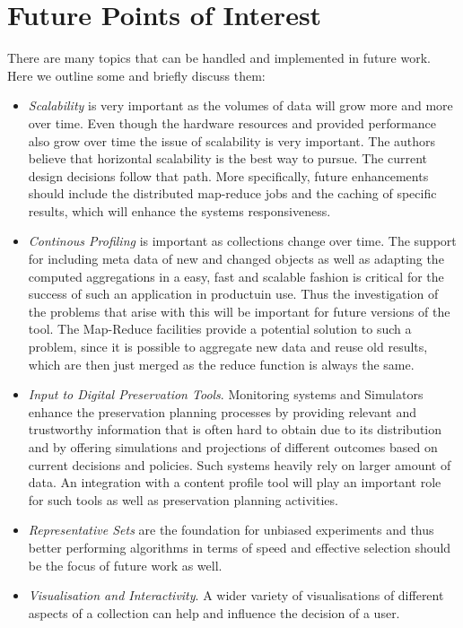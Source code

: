 \section{Future Points of Interest}
There are many topics that can be handled and implemented in future work. Here we outline some and briefly discuss them:
\begin {itemize}
\item \textit{Scalability} is very important as the volumes of data will grow more and more over time. Even though the hardware resources and provided performance also grow over time the issue of scalability is very important. The authors believe that horizontal scalability is the best way to pursue. The current design decisions follow that path. More specifically, future enhancements should include the distributed map-reduce jobs and the caching of specific results, which will enhance the systems responsiveness.
\item \textit{Continous Profiling} is important as collections change over time. The support for including meta data of new and changed objects as well as adapting the computed aggregations in a easy, fast and scalable fashion is critical for the success of such an application in productuin use. Thus the investigation of the problems that arise with this will be important for future versions of the tool. The Map-Reduce facilities provide a potential solution to such a problem, since it is possible to aggregate new data and reuse old results, which are then just merged as the reduce function is always the same. 
\item \textit{Input to Digital Preservation Tools}. Monitoring systems and Simulators enhance the preservation planning processes by providing relevant and trustworthy information that is often hard to obtain due to its distribution and by offering simulations and projections of different outcomes based on current decisions and policies. Such systems heavily rely on larger amount of data. An integration with a content profile tool will play an important role for such tools as well as preservation planning activities.
\item \textit{Representative Sets} are the foundation for unbiased experiments and thus better performing algorithms in terms of speed and effective selection should be the focus of future work as well. 
\item \textit{Visualisation and Interactivity}. A wider variety of visualisations of different aspects of a collection can help and influence the decision of a user.
\end{itemize}

